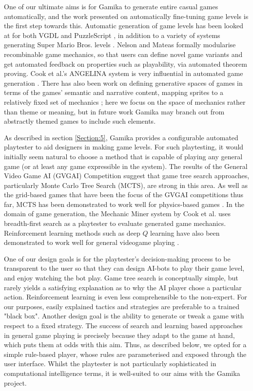 \documentclass{IEEEtran}
\begin{document}
One of our ultimate aims is for Gamika to generate entire casual games automatically, and the work presented on automatically fine-tuning game levels is the first step towards this. Automatic generation of game levels has been looked at for both VGDL \cite{nielsen:cig15} and PuzzleScript \cite{lim:cig14} \cite{khalifi2015}, in addition to a variety of systems generating Super Mario Bros. levels \cite{horn:fdg14}. Nelson and Mateas \cite{Mechanics:AIIDE08} formally modularise recombinable game mechanics, so that users can define novel game variants and get automated feedback on properties such as playability, via automated theorem proving. Cook et al.'s ANGELINA system is very influential in automated game generation \cite{cook:tcaig16}. There has also been work on defining generative spaces of games in terms of the games' semantic and narrative content, mapping sprites to a relatively fixed set of mechanics \cite{Assistant:IUI08}\cite{treanor12}; here we focus on the space of mechanics rather than theme or meaning, but in future work Gamika may branch out from abstractly themed games to include such elements.

As described in section \ref{Section:5}, Gamika provides a configurable automated playtester to aid designers in making game levels. For such playtesting, it would initially seem natural to choose a method that is capable of playing any general game (or at least any game expressible in the system). The results of the General Video Game AI (GVGAI) Competition \cite{perez2015gvgai} suggest that game tree search approaches, particularly Monte Carlo Tree Search (MCTS), are strong in this area. As well as the grid-based games that have been the focus of the GVGAI competitions thus far, MCTS has been demonstrated to work well for physics-based games \cite{Perez2013}. In the domain of game generation, the Mechanic Miner system by Cook et al. \cite{cook:evogames13} uses breadth-first search as a playtester to evaluate generated game mechanics. Reinforcement learning methods such as deep $Q$ learning have also been demonstrated to work well for general videogame playing \cite{mnih-dqn-2015}.

One of our design goals is for the playtester's decision-making process to be transparent to the user so that they can design AI-bots to play their game level, and enjoy watching the bot play. Game tree search is conceptually simple, but rarely yields a satisfying explanation as to why the AI player chose a particular action. Reinforcement learning is even less comprehensible to the non-expert. For our purposes, easily explained tactics and strategies are preferable to a trained "black box". Another design goal is the ability to generate or tweak a game with respect to a fixed strategy. The success of search and learning based approaches in general game playing is precisely because they adapt to the game at hand, which puts them at odds with this aim.
Thus, as described below, we opted for a simple rule-based player, whose rules are parameterised and exposed through the user interface. Whilst the playtester is not particularly sophisticated in computational intelligence terms, it is well-suited to our aims with the Gamika project.
\end{document}
